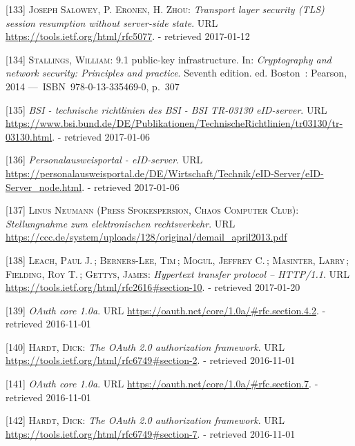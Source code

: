 \documentclass[12pt,english,a4paper,titlepage,cleardoublepage=empty,dottedtoc]{report}
\begin{document}
\hypertarget{ref-web_spec_tls-session-ticket-resumption}{}
{[}133{]} \textsc{Joseph Salowey, P. Eronen, \textnormal{H. Zhou}}:
\emph{Transport layer security (TLS) session resumption without
server-side state}. URL \url{https://tools.ietf.org/html/rfc5077}. -
retrieved 2017-01-12

\hypertarget{ref-book_2014_chapter-10-5-asym-random-number-gen}{}
{[}134{]} \textsc{Stallings, William}: 9.1 public-key infrastructure.
In: \emph{Cryptography and network security: Principles and practice}.
Seventh edition. ed. Boston~: Pearson, 2014 ---~ISBN~978-0-13-335469-0,
p.~307

\hypertarget{ref-web_bsi-spec_eid}{}
{[}135{]} \emph{BSI - technische richtlinien des BSI - BSI TR-03130
eID-server}. URL
\url{https://www.bsi.bund.de/DE/Publikationen/TechnischeRichtlinien/tr03130/tr-03130.html}.
- retrieved 2017-01-06

\hypertarget{ref-web_2017_npa-eid-server}{}
{[}136{]} \emph{Personalausweisportal - eID-server}. URL
\url{https://personalausweisportal.de/DE/Wirtschaft/Technik/eID-Server/eID-Server_node.html}.
- retrieved 2017-01-06

\hypertarget{ref-statement_2013_de-mail}{}
{[}137{]} \textsc{Linus Neumann (Press Spokespersion, Chaos Computer
Club)}: \emph{Stellungnahme zum elektronischen rechtsverkehr}. URL
\url{https://ccc.de/system/uploads/128/original/demail_april2013.pdf}

\hypertarget{ref-web_spec_http-error-codes}{}
{[}138{]} \textsc{Leach, Paul J.}\,; \textsc{Berners-Lee, Tim}\,;
\textsc{Mogul, Jeffrey C.}\,; \textsc{Masinter, Larry}\,;
\textsc{Fielding, Roy T.}\,; \textsc{Gettys, James}: \emph{Hypertext
transfer protocol -- HTTP/1.1}. URL
\url{https://tools.ietf.org/html/rfc2616\#section-10}. - retrieved
2017-01-20

\hypertarget{ref-web_spec_oauth-1a_client-reg}{}
{[}139{]} \emph{OAuth core 1.0a}. URL
\url{https://oauth.net/core/1.0a/\#rfc.section.4.2}. - retrieved
2016-11-01

\hypertarget{ref-web_spec_oauth-2_client-reg}{}
{[}140{]} \textsc{Hardt, Dick}: \emph{The OAuth 2.0 authorization
framework}. URL \url{https://tools.ietf.org/html/rfc6749\#section-2}. -
retrieved 2016-11-01

\hypertarget{ref-web_spec_oauth-1a_access-verification}{}
{[}141{]} \emph{OAuth core 1.0a}. URL
\url{https://oauth.net/core/1.0a/\#rfc.section.7}. - retrieved
2016-11-01

\hypertarget{ref-web_spec_oauth-2_access-verification}{}
{[}142{]} \textsc{Hardt, Dick}: \emph{The OAuth 2.0 authorization
framework}. URL \url{https://tools.ietf.org/html/rfc6749\#section-7}. -
retrieved 2016-11-01
\end{document}
